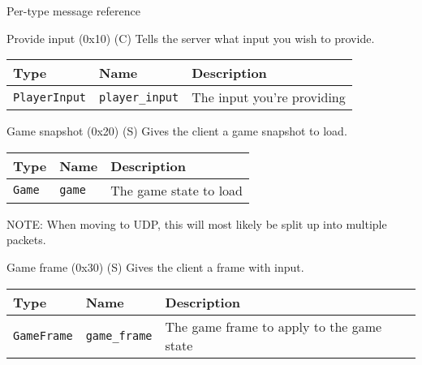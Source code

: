 \documentclass[a4paper,draft]{article}
\begin{document}
\begin{section}{Per-type message reference}
  \begin{subsection}{Provide input (0x10) (C)}
    Tells the server what input you wish to provide.

    \begin{tabular}{lll}
      \hline
      Type & Name & Description \\
      \hline
      \texttt{PlayerInput} & \texttt{player\_input} & The input you're providing \\
      \hline
    \end{tabular}
  \end{subsection}

  \begin{subsection}{Game snapshot (0x20) (S)}
    Gives the client a game snapshot to load.

    \begin{tabular}{lll}
      \hline
      Type & Name & Description \\
      \hline
      \texttt{Game} & \texttt{game} & The game state to load\\
      \hline
    \end{tabular}

    NOTE: When moving to UDP, this will most likely be split up into multiple packets.
  \end{subsection}

  \begin{subsection}{Game frame (0x30) (S)}
    Gives the client a frame with input.

    \begin{tabular}{lll}
      \hline
      Type & Name & Description \\
      \hline
      \texttt{GameFrame} & \texttt{game\_frame} & The game frame to apply to the game state \\
      \hline
    \end{tabular}
  \end{subsection}
\end{section}
\end{document}

